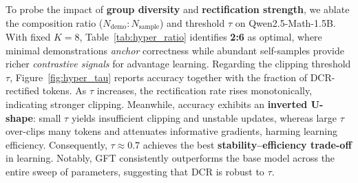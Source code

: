 
To probe the impact of \textbf{group diversity} and \textbf{rectification strength}, we ablate the composition ratio ($N_{\mathrm{demo}}:N_{\mathrm{sample}}$) and threshold $\tau$ on Qwen2.5-Math-1.5B.
With fixed $K=8$, Table~\ref{tab:hyper_ratio} identifies \textbf{2:6} as optimal, where minimal demonstrations \textit{anchor} correctness while abundant self-samples provide richer \textit{contrastive signals} for advantage learning.
Regarding the clipping threshold $\tau$, Figure~\ref{fig:hyper_tau} reports accuracy together with the fraction of DCR-rectified tokens. As $\tau$ increases, the rectification rate rises monotonically, indicating stronger clipping. Meanwhile, accuracy exhibits an \textbf{inverted U-shape}: small $\tau$ yields insufficient clipping and unstable updates, whereas large $\tau$ over-clips many tokens and attenuates informative gradients, harming learning efficiency. Consequently, $\tau \approx 0.7$ achieves the best \textbf{stability--efficiency trade-off} in learning. Notably, GFT consistently outperforms the base model across the entire sweep of parameters, suggesting that DCR is robust to $\tau$.





